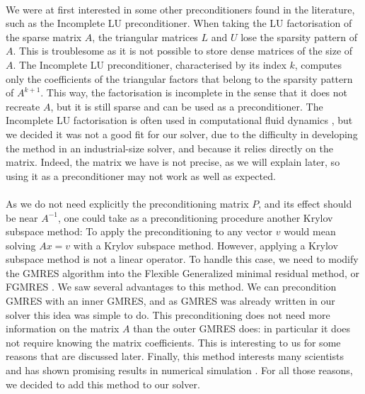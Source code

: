       \paragraph{}
      We were at first interested in some other preconditioners found in the literature, such as the Incomplete LU preconditioner.
      When taking the LU factorisation of the sparse matrix $A$, the triangular matrices $L$ and $U$ lose the sparsity pattern of $A$.
      This is troublesome as it is not possible to store dense matrices of the size of $A$.
      The Incomplete LU preconditioner, characterised by its index $k$, computes only the coefficients of the triangular factors that belong to the sparsity pattern of $A^{k+1}$.
      This way, the factorisation is incomplete in the sense that it does not recreate $A$, but it is still sparse and can be used as a preconditioner.
      The Incomplete LU factorisation is often used in computational fluid dynamics \cite{LiuZhangZhongEtAl2015, AhrabiMavriplis2020}, but we decided it was not a good fit for our solver, due to the difficulty in developing the method in an industrial-size solver, and because it relies directly on the matrix.
      Indeed, the matrix we have is not precise, as we will explain later, so using it as a preconditioner may not work as well as expected.

      \paragraph{}
      As we do not need explicitly the preconditioning matrix $P$, and its effect should be near $A^{-1}$, one could take as a preconditioning procedure another Krylov subspace method:
      To apply the preconditioning to any vector $v$ would mean solving $Ax = v$ with a Krylov subspace method.
      However, applying a Krylov subspace method is not a linear operator.
      To handle this case, we need to modify the GMRES algorithm into the Flexible Generalized minimal residual method, or FGMRES \cite{Saad1993, SimonciniSzyld2002}.
      We saw several advantages to this method.
      We can precondition GMRES with an inner GMRES, and as GMRES was already written in our solver this idea was simple to do.
      This preconditioning does not need more information on the matrix $A$ than the outer GMRES does: in particular it does not require knowing the matrix coefficients.
      This is interesting to us for some reasons that are discussed later.
      Finally, this method interests many scientists \cite{CoulaudGiraudRametEtAl2013, Vasseur2016} and has shown promising results in numerical simulation \cite{Pinel2010}.
      For all those reasons, we decided to add this method to our solver.

